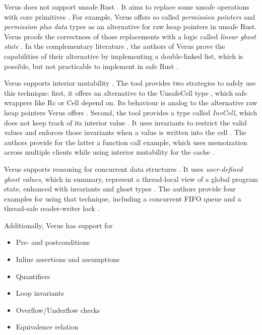 Verus does not support unsafe Rust \cite{lattuadaVerusVerifyingRust2023}. It aims to replace some unsafe operations with core primitives \cite{lattuadaVerusVerifyingRust2023}. For example, Verus offers so called \textit{permission pointers} and \textit{permission plus data} types as an alternative for raw heap pointers in unsafe Rust. Verus proofs the correctness of those replacements with a logic called \textit{linear ghost state} \cite{lattuadaVerusVerifyingRust2023}. In the complementary literature \cite{lattuadaVerusVerifyingRust2023,lattuada_verus_2023}, the authors of Verus prove the capabilities of their alternative by implementing a double-linked list, which is possible, but not practicable to implement in safe Rust \cite{learning_rust_with_entirely_too_many_linked_lists_final_2023}. 

Verus supports interior mutability \cite{lattuadaVerusVerifyingRust2023}. The tool provides two strategies to safely use this technique: first, it offers an alternative to the UnsafeCell type \cite{lattuadaVerusVerifyingRust2023}, which safe wrappers like Rc or Cell depend on. Its behaviour is analog to the alternative raw heap pointers Verus offers \cite{lattuadaVerusVerifyingRust2023}. Second, the tool provides a type called \textit{InvCell}, which does not keep track of its interior value \cite{lattuadaVerusVerifyingRust2023}. It uses invariants to restrict the valid values and enforces those invariants when a value is written into the cell \cite{lattuadaVerusVerifyingRust2023}. 
The authors provide for the latter a function call example, which uses memoization across multiple clients while using interior mutability for the cache \cite{lattuadaVerusVerifyingRust2023,lattuada_verus_2023}.

Verus supports reasoning for concurrent data structures \cite{lattuadaVerusVerifyingRust2023}. It uses \textit{user-defined ghost values}, which in summary, represent a thread-local view of a global program state, enhanced with invariants and ghost types \cite{lattuadaVerusVerifyingRust2023}. The authors provide four examples for using that technique, including a concurrent FIFO queue and a thread-safe reader-writer lock \cite{lattuadaVerusVerifyingRust2023,lattuada_verus_2023}.

Additionally, Verus has support for
\begin{itemize}
    \item Pre- and postconditions \cite{lattuadaVerusVerifyingRust2023}
    \item Inline assertions and assumptions \cite{lattuadaVerusVerifyingRust2023,verus-lang_assert_2023}
    \item Quantifiers \cite{lattuadaVerusVerifyingRust2023,verus-lang_quantifiers_2023}
    \item Loop invariants \cite{lattuadaVerusVerifyingRust2023,verus-lang_loops_2023}
    \item Overflow/Underflow checks \cite{verus-lang_integers_2023}
    \item Equivalence relation \cite{verus-lang_equality_2023}
\end{itemize}

